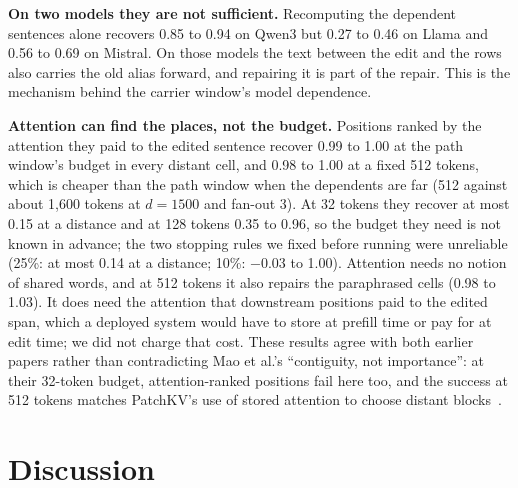 \documentclass[conference]{IEEEtran}
\begin{document}
\textbf{On two models they are not sufficient.} Recomputing the dependent sentences alone recovers 0.85 to
0.94 on Qwen3 but 0.27 to 0.46 on Llama and 0.56 to 0.69 on Mistral. On those models the text between the edit
and the rows also carries the old alias forward, and repairing it is part of the repair. This is the mechanism
behind the carrier window's model dependence.

\textbf{Attention can find the places, not the budget.} Positions ranked by the attention they paid to the
edited sentence recover 0.99 to 1.00 at the path window's budget in every distant cell, and 0.98 to 1.00 at
a fixed 512 tokens, which is
cheaper than the path window when the dependents are far (512 against about 1,600 tokens at $d=1500$ and
fan-out 3). At 32 tokens they recover at most 0.15 at a distance and at 128 tokens 0.35 to 0.96, so the
budget they need is not known in advance; the two stopping rules we fixed before running were unreliable
(25\%: at most 0.14 at a distance; 10\%: $-0.03$ to 1.00). Attention needs no notion of shared words, and at 512 tokens it
also repairs the paraphrased cells (0.98 to 1.03). It does need the attention that downstream positions paid to
the edited span, which a deployed system would have to store at prefill time or pay for at edit time; we did not
charge that cost. These results agree with both earlier papers rather than contradicting Mao et al.'s
``contiguity, not importance'': at their 32-token budget, attention-ranked positions fail here too, and the
success at 512 tokens matches PatchKV's use of stored attention to choose distant blocks~\cite{yang2026patchkv}.

\section{Discussion}
\end{document}
